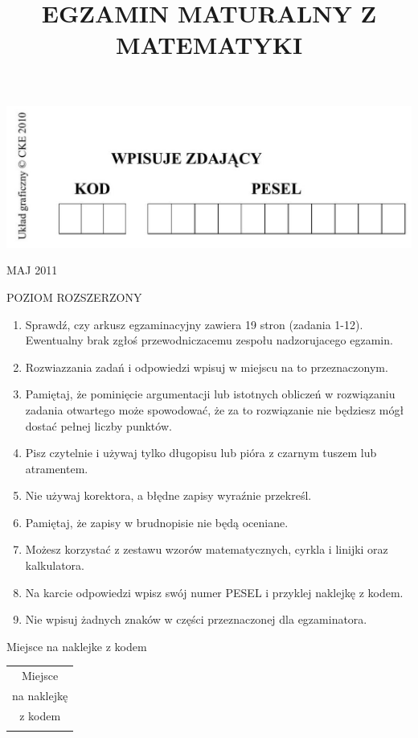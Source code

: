 \documentclass[10pt]{article}
\title{EGZAMIN MATURALNY Z MATEMATYKI }
\author{}
\date{}
\begin{document}
\maketitle
\begin{center}
\includegraphics[max width=\textwidth]{2024_11_21_b36d8cbb94edb763da2cg-01}
\end{center}

MAJ 2011

POZIOM ROZSZERZONY

\begin{enumerate}
  \item Sprawdź, czy arkusz egzaminacyjny zawiera 19 stron (zadania 1-12). Ewentualny brak zgłoś przewodniczacemu zespołu nadzorujacego egzamin.
  \item Rozwiazzania zadań i odpowiedzi wpisuj w miejscu na to przeznaczonym.
  \item Pamiętaj, że pominięcie argumentacji lub istotnych obliczeń w rozwiązaniu zadania otwartego może spowodować, że za to rozwiązanie nie będziesz mógł dostać pełnej liczby punktów.
  \item Pisz czytelnie i używaj tylko długopisu lub pióra z czarnym tuszem lub atramentem.
  \item Nie używaj korektora, a błędne zapisy wyraźnie przekreśl.
  \item Pamiętaj, że zapisy w brudnopisie nie będą oceniane.
  \item Możesz korzystać z zestawu wzorów matematycznych, cyrkla i linijki oraz kalkulatora.
  \item Na karcie odpowiedzi wpisz swój numer PESEL i przyklej naklejkę z kodem.
  \item Nie wpisuj żadnych znaków w części przeznaczonej dla egzaminatora.
\end{enumerate}

Miejsce na naklejke z kodem

\begin{center}
\begin{tabular}{c|}
\hline
Miejsce \\
na naklejkę \\
z kodem \\
 \\
\hline
\end{tabular}
\end{center}
\end{document}
